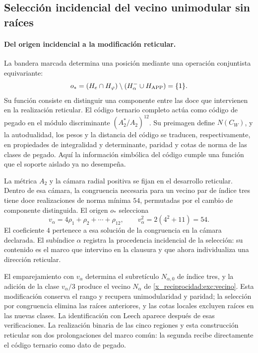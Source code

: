 \subsection{Selección incidencial del vecino unimodular sin raíces}
\label{x_reciprocidad:exc:leech}


\paragraph{Del origen incidencial a la modificación reticular.}
\label{x_reciprocidad:inc-ampl-reticulo}
La bandera marcada determina una posición mediante una operación
conjuntista equivariante:
\[
 o_*=(H_e\cap H_\varphi)
       \setminus(H^-_\alpha\cup H_{\rm APP})=\{1\}.
\]
Su función consiste en distinguir una componente entre las doce que
intervienen en la realización reticular. El código ternario completo
actúa como código de pegado en el módulo discriminante
$(A_2^*/A_2)^{12}$. Su preimagen define $N(C_W)$, y la
autodualidad, los pesos y la distancia del código se traducen,
respectivamente, en propiedades de integralidad y determinante, paridad
y cotas de norma de las clases de pegado. Aquí la información simbólica
del código cumple una función que el soporte aislado ya no desempeña.

La métrica $A_2$ y la cámara radial positiva se fijan en el desarrollo
reticular. Dentro de esa cámara, la congruencia necesaria para un vecino
par de índice tres tiene doce realizaciones de norma mínima $54$,
permutadas por el cambio de componente distinguida. El origen $o_*$
selecciona
\[
 v_\alpha=4\rho_1+\rho_2+\cdots+\rho_{12},\qquad
 v_\alpha^2=2(4^2+11)=54.
\]
El coeficiente $4$ pertenece a esa solución de la congruencia en la
cámara declarada. El subíndice $\alpha$ registra la procedencia
incidencial de la selección: su contenido es el marco que intervino en
la clausura y que ahora individualiza una dirección reticular.

El emparejamiento con $v_\alpha$ determina el subretículo
$N_{\alpha,0}$ de índice tres, y la adición de la clase
$v_\alpha/3$ produce el vecino $N_\alpha$ de
\eqref{x_reciprocidad:exc:vecino}. Esta modificación conserva el rango y recupera
unimodularidad y paridad; la selección por congruencia elimina las raíces
anteriores, y las cotas locales excluyen raíces en las nuevas clases.
La identificación con Leech aparece después de esas verificaciones. La
realización binaria de las cinco regiones y esta construcción reticular
son dos prolongaciones del marco común: la segunda recibe directamente
el código ternario como dato de pegado.


